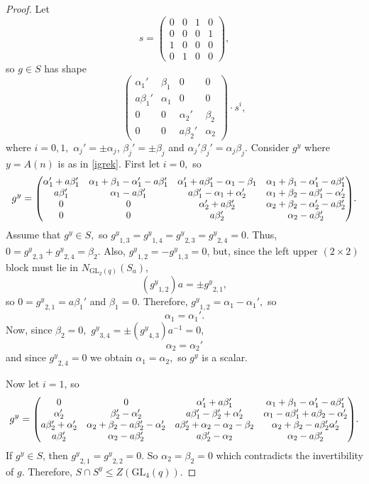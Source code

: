 \documentclass[a4paper,reqno,11pt]{amsart}
\theoremstyle{definition}
\theoremstyle{remark}
\numberwithin{equation}{section}
\newcommand{\GL}{{\mathrm{GL}}}
\newcommand*{\Scale}[2][4]{\scalebox{#1}{$#2$}}
\begin{document}
\begin{proof}
Let $$s=
\begin{pmatrix}
0 & 0& 1 & 0\\
0 & 0& 0 & 1\\
1 & 0& 0 & 0\\
0 & 1& 0 & 0
\end{pmatrix},
$$  
so  $g \in S$ has shape 
$$
\begin{pmatrix}
\alpha_1' & \beta_1& 0 & 0\\
a \beta_1' &  \alpha_1 & 0 & 0 \\
0 & 0& \alpha_2' & \beta_2\\
0 & 0& a \beta_2' & \alpha_2
\end{pmatrix} \cdot s^i,
$$
where $i =0,1,$ $\alpha_j' = \pm \alpha_j$, $\beta_j' = \pm \beta_j$ and $\alpha_j'\beta_j' = \alpha_j \beta_j.$ Consider $g^y$ where $y=A(n)$ is as in \eqref{igrek}. First let $i=0,$ so 
$$g^y = \Scale[0.95]{
\begin{pmatrix}
\alpha_1' +a \beta_1' &\alpha_1+ \beta_1 - \alpha_1' -a\beta_1' & \alpha_1' +a\beta_1'- \alpha_1 - \beta_1 & \alpha_1 + \beta_1 -\alpha_1' -a\beta_1'\\
a \beta_1' &  \alpha_1 -a\beta_1' & a\beta_1' - \alpha_1 + \alpha_2' & \alpha_1 + \beta_2 -a\beta_1' - \alpha_2' \\
0 & 0& \alpha_2' +a\beta_2' & \alpha_2+\beta_2-\alpha_2' -a\beta_2'\\
0 & 0& a \beta_2' & \alpha_2 - a\beta_2'
\end{pmatrix}}.
$$ 
Assume that $g^y \in S,$ so ${g^y}_{1,3}={g^y}_{1,4}={g^y}_{2,3}={g^y}_{2,4}=0.$ Thus, $0={g^y}_{2,3}+{g^y}_{2,4}=\beta_2.$ Also, ${g^y}_{1,2}= - {g^y}_{1,3} = 0$, but, since the left upper $(2 \times 2)$ block must lie in $N_{\GL_2(q)}(S_a)$, 
$$({g^y}_{1,2})a = \pm {g^y}_{2,1},$$
so $0 ={g^y}_{2,1} = a\beta_1'$ and $\beta_1=0.$ Therefore, ${g^y}_{1,2}= \alpha_1 -\alpha_1',$ so
$$\alpha_1 =\alpha_1'.$$ Now, since $\beta_2=0,$ ${g^y}_{3,4} = \pm ({g^y}_{4,3}) a^{-1}=0,$  
$$\alpha_2=\alpha_2'$$
and since ${g^y}_{2,4}=0$ we obtain $\alpha_1=\alpha_2,$ so $g^y$ is a scalar.  

Now let $i=1$, so 
$$g^y = \Scale[0.95]{
\begin{pmatrix}
0 & 0 & \alpha_1' + a\beta_1'& \alpha_1 +\beta_1 - \alpha_1' - a\beta_1'\\
\alpha_2' &  \beta_2'-\alpha_2' & a\beta_1' - \beta_2' + \alpha_2' & \alpha_1 - a\beta_1' +a\beta_2 - \alpha_2' \\
a \beta_2' + \alpha_2' & \alpha_2 + \beta_2 -a\beta_2' -\alpha_2'& a\beta_2' + \alpha_2 - \alpha_2 -\beta_2 & \alpha_2+ \beta_2 - a\beta_2' \alpha_2'\\
a\beta_2' & \alpha_2 -a \beta_2'& a\beta_2' - \alpha_2 & \alpha_2 - a\beta_2'
\end{pmatrix}}.
$$ 
If $g^y \in  S$, then ${g^y}_{2,1}={g^y}_{2,2}=0.$ So $\alpha_2 = \beta_2= 0$ which  contradicts the invertibility of $g.$
Therefore, $S \cap S^y  \le Z(\GL_4(q)).$ 


\end{proof}
\end{document}
